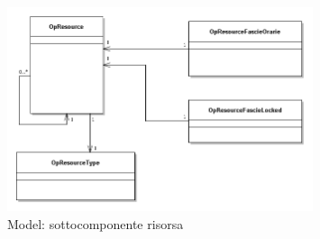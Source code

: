 \begin{figure}[H]
\begin{center}
\includegraphics[width=0.80\textwidth]{img/Resource.png}
\caption{Model: sottocomponente risorsa}
\label{fig:Model: sottocomponente risorsa}
\end{center}
\end{figure}

